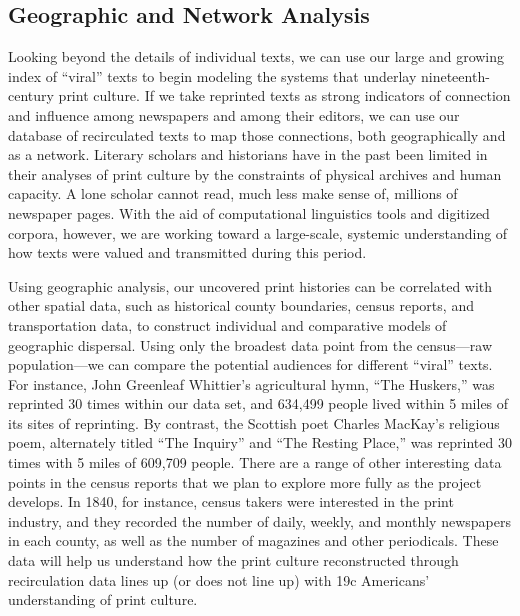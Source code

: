 \documentclass[pdftex,11pt]{article}
\begin{document}
\subsection{Geographic and Network Analysis}
\label{sec:network}

Looking beyond the details of individual texts, we can use our large
and growing index of ``viral'' texts to begin modeling the systems
that underlay nineteenth-century print culture. If we take reprinted
texts as strong indicators of connection and influence among
newspapers and among their editors, we can use our database of
recirculated texts to map those connections, both geographically and
as a network. Literary scholars and historians have in the past been
limited in their analyses of print culture by the constraints of
physical archives and human capacity. A lone scholar cannot read, much
less make sense of, millions of newspaper pages. With the aid of
computational linguistics tools and digitized corpora, however, we are
working toward a large-scale, systemic understanding of how texts were
valued and transmitted during this period.

Using geographic analysis, our uncovered print histories can be
correlated with other spatial data, such as historical county
boundaries, census reports, and transportation data, to construct
individual and comparative models of geographic dispersal. Using only
the broadest data point from the census---raw population---we can
compare the potential audiences for different ``viral'' texts.  For
instance, John Greenleaf Whittier's agricultural hymn, ``The
Huskers,'' was reprinted 30 times within our data set, and 634,499
people lived within 5 miles of its sites of reprinting. By contrast,
the Scottish poet Charles MacKay's religious poem, alternately titled
``The Inquiry'' and ``The Resting Place,'' was reprinted 30 times with
5 miles of 609,709 people. There are a range of other interesting data
points in the census reports that we plan to explore more fully as the
project develops. In 1840, for instance, census takers were interested
in the print industry, and they recorded the number of daily, weekly,
and monthly newspapers in each county, as well as the number of
magazines and other periodicals. These data will help us understand
how the print culture reconstructed through recirculation data lines
up (or does not line up) with 19c Americans' understanding of print
culture.
\end{document}

